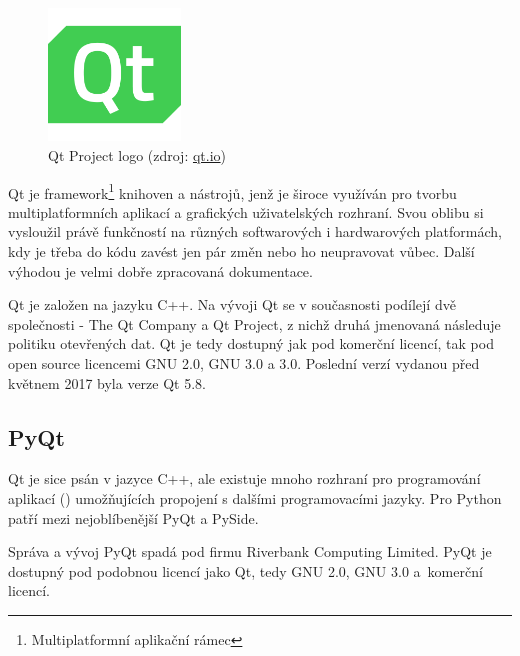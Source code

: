 \begin{figure}[H] \centering
      \includegraphics[width=100pt]{./pictures/qt_logo_green_256x256px.png}
      \caption[Qt Project logo]{Qt Project logo (zdroj:
\href{http://brand.qt.io/downloads/}{qt.io})}
      \label{fig:qt}
  \end{figure}

Qt je framework\footnote{Multiplatformní aplikační rámec} knihoven a
nástrojů, jenž je široce využíván pro tvorbu multiplatformních
aplikací a grafických uživatelských rozhraní. Svou oblibu si vysloužil
právě funkčností na různých softwarových i hardwarových platformách,
kdy je třeba do kódu zavést jen pár změn nebo ho neupravovat
vůbec. Další výhodou je velmi dobře zpracovaná dokumentace.

Qt je založen na jazyku C++. Na vývoji Qt se v současnosti podílejí
dvě společnosti - The Qt Company a Qt Project, z nichž druhá jmenovaná
následuje politiku otevřených dat. Qt je tedy dostupný jak pod
komerční licencí, tak pod open source licencemi GNU  2.0, GNU
 3.0 a  3.0. Poslední verzí vydanou před květnem 2017
byla verze Qt 5.8. \cite{qt}


\subsection{PyQt} Qt je sice psán v jazyce C++, ale existuje mnoho
rozhraní pro programování aplikací () umožňujících propojení s
dalšími programovacími jazyky. Pro Python patří mezi nejoblíbenější
PyQt a PySide.

Správa a vývoj PyQt spadá pod firmu Riverbank Computing Limited. PyQt
je dostupný pod podobnou licencí jako Qt, tedy GNU  2.0, GNU
 3.0 a~komerční licencí. \cite{pyqt}


